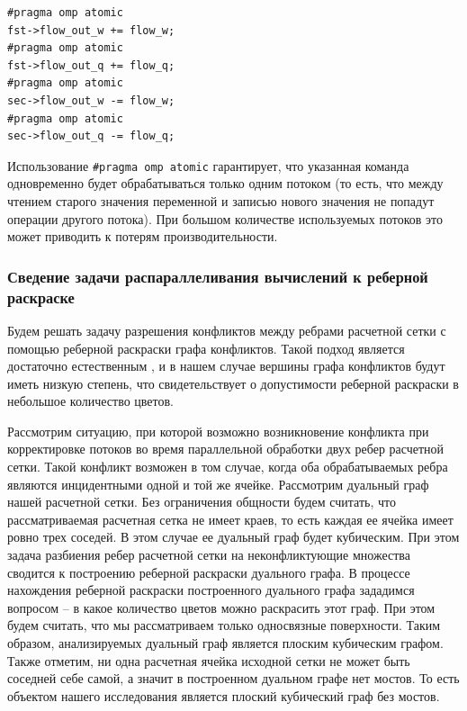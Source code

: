 \begin{lstlisting}[caption={Атомарные операции корректировки потоков.}, label={lst:text_3_atomic_flows}]
#pragma omp atomic
fst->flow_out_w += flow_w;
#pragma omp atomic
fst->flow_out_q += flow_q;
#pragma omp atomic
sec->flow_out_w -= flow_w;
#pragma omp atomic
sec->flow_out_q -= flow_q;
\end{lstlisting}

Использование \texttt{\#pragma omp atomic} гарантирует, что указанная команда одновременно будет обрабатываться только одним потоком (то есть, что между чтением старого значения переменной и записью нового значения не попадут операции другого потока).
При большом количестве используемых потоков это может приводить к потерям производительности.

\subsubsection{Сведение задачи распараллеливания вычислений к реберной раскраске}

Будем решать задачу разрешения конфликтов между ребрами расчетной сетки с помощью реберной раскраски графа конфликтов.
Такой подход является достаточно естественным \cite{Gilfanov2021Coloring}, и в нашем случае вершины графа конфликтов будут иметь низкую степень, что свидетельствует о допустимости реберной раскраски в небольшое количество цветов.

Рассмотрим ситуацию, при которой возможно возникновение конфликта при корректировке потоков во время параллельной обработки двух ребер расчетной сетки.
Такой конфликт возможен в том случае, когда оба обрабатываемых ребра являются инцидентными одной и той же ячейке.
Рассмотрим дуальный граф нашей расчетной сетки.
Без ограничения общности будем считать, что рассматриваемая расчетная сетка не имеет краев, то есть каждая ее ячейка имеет ровно трех соседей.
В этом случае ее дуальный граф будет кубическим.
При этом задача разбиения ребер расчетной сетки на неконфликтующие множества сводится к построению реберной раскраски дуального графа.
В процессе нахождения реберной раскраски построенного дуального графа зададимся вопросом -- в какое количество цветов можно раскрасить этот граф.
При этом будем считать, что мы рассматриваем только односвязные поверхности.
Таким образом, анализируемых дуальный граф является плоским кубическим графом.
Также отметим, ни одна расчетная ячейка исходной сетки не может быть соседней себе самой, а значит в построенном дуальном графе нет мостов.
То есть объектом нашего исследования является плоский кубический граф без мостов.

